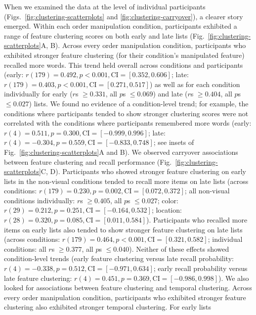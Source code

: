 \documentclass[11pt]{article}
\begin{document}
When we examined the data at the level of individual participants
(Figs.~\ref{fig:clustering-scatterplots} and \ref{fig:clustering-carryover}), a
clearer story emerged. Within each order manipulation condition, participants
exhibited a range of feature clustering scores on both early and late lists
(Fig.~\ref{fig:clustering-scatterplots}A, B). Across every order manipulation
condition, participants who exhibited stronger feature clustering (for their
condition's manipulated feature) recalled more words. This trend held overall
across conditions and participants (early: $r(179) = 0.492, p < 0.001,
\mathrm{CI} = [0.352, 0.606]$; late: $r(179) = 0.403, p < 0.001, \mathrm{CI} =
[0.271, 0.517]$) as well as for each condition individually for early ($r$s
$\geq 0.331$, all $p$s $\leq 0.069$) and late ($r$s $\geq 0.404$, all $p$s
$\leq 0.027$) lists. We found no evidence of a condition-level trend; for
example, the conditions where participants tended to show stronger clustering
scores were not correlated with the conditions where participants remembered
more words (early: $r(4) = 0.511, p = 0.300, \mathrm{CI} = [-0.999, 0.996]$;
late: $r(4) = -0.304, p = 0.559, \mathrm{CI} = [-0.833, 0.748]$; see insets of
Fig.~\ref{fig:clustering-scatterplots}A and B). We observed carryover
associations between feature clustering and recall performance
(Fig.~\ref{fig:clustering-scatterplots}C, D). Participants who showed stronger
feature clustering on early lists in the non-visual conditions tended to recall
more items on late lists (across conditions: $r(179) = 0.230, p = 0.002,
\mathrm{CI} = [0.072, 0.372]$; all non-visual conditions individually: $r$s
$\geq 0.405$, all $p$s $\leq 0.027$; color: $r(29) = 0.212, p = 0.251,
\mathrm{CI} = [-0.164, 0.532]$; location: $r(28) = 0.320, p = 0.085,
\mathrm{CI} = [0.011, 0.584]$). Participants who recalled more items on early
lists also tended to show stronger feature clustering on late lists (across
conditions: $r(179) = 0.464, p < 0.001, \mathrm{CI} = [0.321, 0.582]$;
individual conditions: all $r$s $\geq 0.377$, all $p$s $\leq 0.040$). Neither
of these effects showed condition-level trends (early feature clustering versus
late recall probability: $r(4) = -0.338, p = 0.512, \mathrm{CI} = [-0.971,
0.634]$; early recall probability versus late feature clustering: $r(4) =
0.451, p = 0.369, \mathrm{CI} = [-0.986, 0.998]$). We also looked for
associations between feature clustering and temporal clustering. Across every
order manipulation condition, participants who exhibited stronger feature
clustering also exhibited stronger temporal clustering. For early lists
\end{document}
